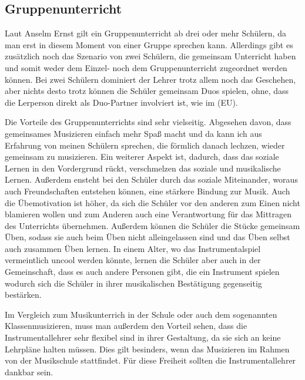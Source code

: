 \subsection{Gruppenunterricht} 
Laut Anselm Ernst gilt ein Gruppenunterricht ab drei oder mehr Schülern, da man
erst in diesem Moment von einer Gruppe sprechen kann.
\autocite[79]{ernst:die_zukunftsfaehige_musikschule}
Allerdings gibt es zusätzlich noch das Szenario von zwei Schülern, die gemeinsam
Unterricht haben und somit weder dem Einzel- noch dem Gruppenunterricht
zugeordnet werden können. Bei zwei Schülern dominiert der Lehrer trotz allem
noch das Geschehen, aber nichts desto trotz können die Schüler gemeinsam Duos
spielen, ohne, dass die Lerperson direkt als Duo-Partner involviert ist, wie im (EU).

Die Vorteile des Gruppenunterrichts sind sehr vielseitig. Abgesehen davon, dass
gemeinsames Musizieren einfach mehr Spaß macht und da kann ich aus Erfahrung von
meinen Schülern sprechen, die förmlich danach lechzen, wieder gemeinsam zu
musizieren. Ein weiterer Aspekt ist, dadurch, dass das soziale
Lernen in den Vordergrund rückt, verschmelzen das soziale und musikalische
Lernen. Außerdem ensteht bei den Schüler durch das soziale Miteinander, woraus
auch Freundschaften entstehen können, eine stärkere Bindung zur Musik. Auch die Übemotivation ist höher, da sich die Schüler vor den anderen
zum Einen nicht blamieren wollen und zum Anderen auch eine Verantwortung für das
Mittragen des Unterrichts übernehmen. Außerdem können die Schüler die Stücke
gemeinsam Üben, sodass sie auch beim Üben nicht alleingelassen sind und das Üben
selbst auch zusammen Üben lernen. In einem Alter, wo das Instrumentalspiel
vermeintlich uncool werden könnte, lernen die Schüler aber auch in der
Gemeinschaft, dass es auch andere Personen gibt, die ein Instrument spielen
wodurch sich die Schüler in ihrer musikalischen Bestätigung gegenseitig
bestärken. 

Im Vergleich zum Musikunterrich in der Schule oder auch dem sogenannten
Klassenmusizieren, muss man außerdem den Vorteil sehen, dass die
Instrumentallehrer sehr flexibel sind in ihrer Gestaltung, da sie sich an keine
Lehrpläne halten müssen. Dies gilt besinders, wenn das Musizieren im Rahmen von
der Musikschule stattfindet. Für diese Freiheit sollten die Instrumentallehrer dankbar sein.


